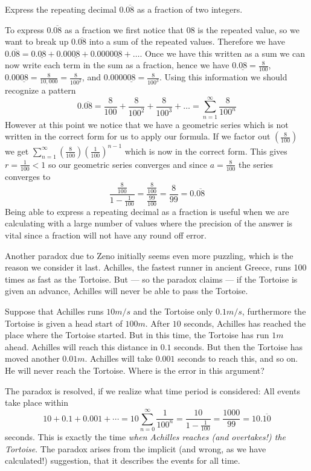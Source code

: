 \begin{Example}
Express the repeating decimal $0.\overline{08}$ as a fraction of two integers.

\solution
To express $0.\overline{08}$ as a fraction we first notice that $08$
is the repeated value, so we want to break up $0.\overline{08}$ into
a sum of the repeated values.  Therefore we have $0.\overline{08}=
0.\underline{08}+ 0.00\underline{08}+ 0.0000\underline{08}+ \ldots$.
Once we have this written as a sum we can now write each term in the
sum as a fraction, hence we have $0.\underline{08}=\frac{8}{100}$,
$0.00\underline{08}=\frac{8}{10,000}=\frac{8}{100^{2}}$, and
$0.0000\underline{08}=\frac{8}{100^{3}}$.  Using this information we
should recognize a pattern $$0.\overline{08} = \frac{8}{100} +
\frac{8}{100^{2}} + \frac{8}{100^{3}} + \ldots = \sum_{n=1}^{\infty}
\frac{8}{100^{n}}$$ However at this point we notice that we have a
geometric series which is not written in the correct form for us to
apply our formula.  If we factor out $(\frac{8}{100})$ we get
$\displaystyle{\sum_{n=1}^{\infty}
(\frac{8}{100})(\frac{1}{100})^{n-1}}$ which is now in the correct
form. This gives $r=\frac{1}{100} <1$ so our geometric series
converges and since $a=\frac{8}{100}$ the series converges to
$$\frac{\frac{8}{100}}{1-\frac{1}{100}}=\frac{\frac{8}{100}}{\frac{99}{100}}=\frac{8}{99}=0.\overline{08}$$
Being able to express a repeating decimal as a fraction is useful
when we are calculating with a large number of values where the
precision of the answer is vital since a fraction will not have
any round off error.  \\
\end{Example}

Another paradox due to Zeno initially seems even more puzzling, which is the
reason we consider it last.
Achilles, the fastest runner in ancient Greece, runs 100 times as
fast as the Tortoise. But --- so the paradox claims --- if the
Tortoise is given an advance, Achilles will never be able to pass
the Tortoise.

\begin{Example}
Suppose that Achilles runs
$10 m/s$ and the Tortoise only $0.1 m/s$, furthermore the Tortoise is given
a head start of $100m$.
After $10$ seconds, Achilles has reached the place where the Tortoise
started. But in this time, the Tortoise has run $1m$ ahead. Achilles will
reach this distance in $0.1$ seconds. But then the Tortoise has moved
another $0.01m$. Achilles will take $0.001$ seconds to reach this, and so
on. He will never reach the Tortoise. Where is the error in this argument?

\solution
The paradox is resolved, if we realize what time period is considered:
All events take place within
\[
10+0.1+0.001+\cdots=10\sum_{n=0}^\infty
\frac{1}{100^n}=\frac{10}{1-\frac{1}{100}}=\frac{1000}{99}=10.\overline{10}
\]
seconds. This is exactly the time {\em when Achilles reaches (and
overtakes!) the Tortoise}. The paradox arises from the implicit
(and wrong, as we have calculated!)
suggestion, that it describes the events for all time.
\end{Example}

